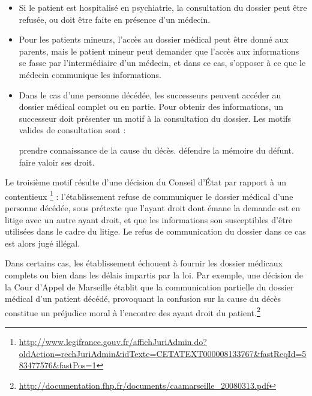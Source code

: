 \begin{itemize}

    \item Si le patient est hospitalisé en psychiatrie, la consultation du dossier peut être
refusée, ou doit être faite en présence d'un médecin.

\item Pour les patients mineurs, l'accès au dossier médical peut être donné aux parents,
mais le patient mineur peut demander que l'accès aux informations se fasse par
l'intermédiaire d'un médecin, et dans ce cas, s'opposer à ce que le médecin communique les informations.

\item Dans le cas d'une personne décédée, les successeurs peuvent accéder au dossier médical complet
    ou en partie. Pour obtenir des informations, un successeur doit présenter un motif
à la consultation du dossier. Les motifs valides de consultation sont :

    \subitem prendre connaissance de la cause du décès.
    \subitem défendre la mémoire du défunt.
    \subitem faire valoir ses droit.

\end{itemize}

Le troisième motif résulte d'une décision du Conseil d'État par rapport à un contentieux
\footnote{\url{http://www.legifrance.gouv.fr/affichJuriAdmin.do?oldAction=rechJuriAdmin&idTexte=CETATEXT000008133767&fastReqId=583477576&fastPos=1}} : l'établissement refuse de communiquer le dossier médical d'une
personne décédée, sous prétexte que l'ayant droit dont émane la demande est en litige avec un autre
ayant droit, et que les informations son susceptibles d'être utilisées dans le cadre du litige.
Le refus de communication du dossier dans ce cas est alors jugé illégal.

Dans certains cas, les établissement échouent à fournir les dossier médicaux complets ou bien dans les
délais impartis par la loi. Par exemple, une décision de la Cour d'Appel de Marseille établit que
la communication partielle du dossier médical d'un patient décédé, provoquant la confusion sur
la cause du décès constitue un préjudice moral à l'encontre des ayant droit
du patient.\footnote{\url{http://documentation.fhp.fr/documents/caamarseille_20080313.pdf}}


